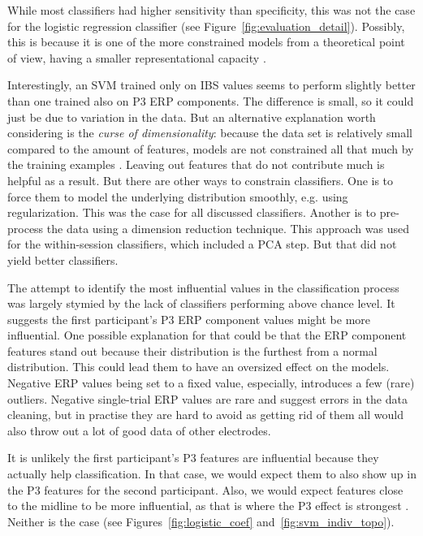 While most classifiers had higher sensitivity than specificity, this was not the
case for the logistic regression classifier (see
Figure~\ref{fig:evaluation_detail}). Possibly, this is because it is one of the
more constrained models from a theoretical point of view, having a smaller
representational capacity \parencite[p.~110]{goodfellow_deep_2016}.

Interestingly, an SVM trained only on IBS values seems to perform slightly
better than one trained also on P3 ERP components. The difference is small, so
it could just be due to variation in the data. But an alternative explanation
worth considering is the \textit{curse of dimensionality}: because the data set
is relatively small compared to the amount of features, models are not
constrained all that much by the training examples
\parencite[p.~151--152]{goodfellow_deep_2016}. Leaving out features that do not
contribute much is helpful as a result. But there are other ways to constrain
classifiers. One is to force them to model the underlying distribution smoothly,
e.g. using regularization. This was the case for all discussed classifiers.
Another is to pre-process the data using a dimension reduction technique. This
approach was used for the within-session classifiers, which included a PCA step.
But that did not yield better classifiers.

The attempt to identify the most influential values in the classification
process was largely stymied by the lack of classifiers performing above chance
level. It suggests the first participant's P3 ERP component values might be more
influential. One possible explanation for that could be that the ERP component
features stand out because their distribution is the furthest from a normal
distribution. This could lead them to have an oversized effect on the models.
Negative ERP values being set to a fixed value, especially, introduces a few
(rare) outliers. Negative single-trial ERP values are rare and suggest errors in
the data cleaning, but in practise they are hard to avoid as getting rid of them
all would also throw out a lot of good data of other electrodes.

It is unlikely the first participant's P3 features are influential because they
actually help classification. In that case, we would expect them to also show up
in the P3 features for the second participant. Also, we would expect features
close to the midline to be more influential, as that is where the P3 effect is
strongest \parencite{polich_neuropsychology_2011}. Neither is the case (see
Figures~\ref{fig:logistic_coef} and~\ref{fig:svm_indiv_topo}).

